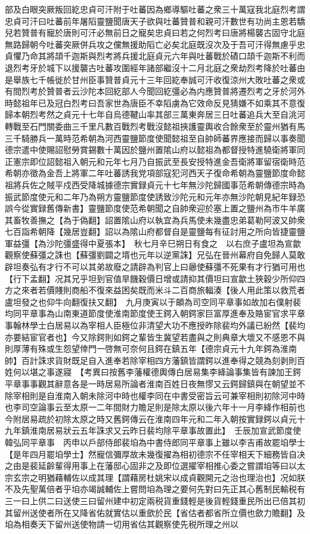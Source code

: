 部及白眼突厥叛回紇忠貞可汗附于吐蕃因為鄉導驅吐蕃之衆三十萬寇我北庭烈考謂忠貞可汗曰吐蕃前年屠䧟靈鹽聞唐天子欲與吐蕃贊普和親可汗數世有功尚主恩若驕兒若贊普有寵於唐則可汗必無前日之寵矣忠貞曰若之何烈考曰唐將楊襲古固守北庭無路歸朝今吐蕃突厥併兵攻之儻無援助䧟亡必矣北庭既沒次及于吾可汗得無慮乎忠貞懼乃命其將頡千迦斯與烈考將兵援北庭貞元六年與吐蕃戰於磧口頡千迦斯不利而退烈考牙於城下以援襲古吐蕃攻圍經年諸部繼沒十二月北庭之衆劫烈考降於吐蕃由是舉族七千帳徙於甘州臣事贊普貞元十三年回紇奉誠可汗收復涼州大敗吐蕃之衆或有間烈考於贊普者云沙陀本回紇部人今聞回紇彊必為内應贊普將遷烈考之牙於河外時懿祖年已及冠白烈考曰吾家世為唐臣不幸䧟虜為它效命反見猜嫌不如乘其不意復歸本朝烈考然之貞元十七年自烏德鞬山率其部三萬東奔居三日吐蕃追兵大至自洮河轉戰至石門關委曲三千里凡數百戰烈考戰沒懿祖挾護靈輿收合餘衆至於靈州猶有馬三千騎勝兵一萬時范希朝為河西靈鹽節度使聞懿祖至自帥師蕃界應接而歸以事奏聞德宗遣中使賜詔慰勞賞錫數十萬因於鹽州置隂山府以懿祖為都督授特進驍衛將軍同正憲宗即位詔懿祖入朝元和元年七月乃自振武至長安授特進金吾衛將軍留宿衛時范希朝亦徵為金吾上將軍二年吐蕃誘我党項部寇犯河西天子復命希朝為靈鹽節度命懿祖將兵佐之賊平戍西受降城據德宗實録貞元十七年無沙陀歸國事范希朝傳德宗時為振武節度使元和二年乃為朔方靈鹽節度使誘致沙陀元和元年亦無沙陀朝見紀年録恐誤今從實録舊傳新書】靈鹽節度使范希朝聞之自帥衆迎於塞上置之鹽州為市牛羊廣其畜牧善撫之【為于偽翻】詔置隂山府以執宜為兵馬使未幾盡忠弟葛勒阿波又帥衆七百詣希朝降【幾居豈翻】詔以為隂山府都督自是靈鹽每有征討用之所向皆捷靈鹽軍益彊【為沙陀彊盛得中夏張本】　秋七月辛巳朔日有食之　以右庶子盧坦為宣歙觀察使蘇彊之誅也【蘇彊劉闢之壻也元年以逆黨誅】兄弘在晉州幕府自免歸人莫敢辟坦奏弘有才行不可以其弟故廢之請辟為判官上曰曏使蘇彊不死果有才行猶可用也【行下孟翻】况其兄乎坦到官值旱饑穀價日增或請抑其價坦曰宣歙土狹穀少所仰四方之來者若價賤則商船不復來益困矣既而米斗二百商旅輻湊【後人用此策以救荒者盧坦發之也仰牛向翻復扶又翻】　九月庚寅以于頔為司空同平章事如故加右僕射裴均同平章事為山南東道節度使淮南節度使王鍔入朝鍔家巨富厚進奉及賂宦官求平章事翰林學士白居易以為宰相人臣極位非清望大功不應授昨除裴均外議已紛然【裴均亦要結宦官者也】今又除鍔則如鍔之輩皆生冀望若盡與之則典章大壞又不感恩不與則厚薄有殊或生怨望倖門一啓無可奈何且鍔在鎮五年【德宗貞元十九年鍔為淮南帥】百計誅求貨財既足自入進奉若除宰相四方藩鎮皆謂鍔以進奉得之競為刻剥則百姓何以堪之事遂寢　【考異曰按舊李藩權德輿傳白居易集李絳論事集皆有諫加王鍔平章事事觀其辭意各是一時居易所論者淮南百姓日夜無憀又云鍔歸鎮與在朝望並不除宰相則是自淮南入朝未除河中時也權李同在中書受密旨云可兼宰相則初除河中時也李司空論事云至太原一二年間財力贍足則是除太原以後六年十一月李絳作相前也今附居易疏於初除太原之時又舊鍔傳云在淮南四年元和二年入朝按實録鍔以貞元十九年鎮淮南居易狀云五年誅求又云昨日裴均除平章事故置此】　壬辰加宣武節度使韓弘同平章事　丙申以戶部侍郎裴垍為中書侍郎同平章事上雖以李吉甫故罷垍學士【是年四月罷垍學士】然寵信彌厚故未幾復擢為相初德宗不任宰相天下細務皆自决之由是裴延齡輩得用事上在藩邸心固非之及即位選擢宰相推心委之嘗謂垍等曰以太宗玄宗之明猶藉輔佐以成其理【謂藉房杜姚宋以成貞觀開元之治也理治也】况如朕不及先聖萬倍者乎垍亦竭誠輔佐上嘗問垍為理之要何先對曰先正其心舊制民輸税有三一曰上供二曰送使三曰留州建中初定兩税貨重錢輕是後貨輕錢重民所出已倍其初其留州送使者所在又降省佑就實估以重歛於民【省估者都省所立價也歛力贍翻】及垍為相奏天下留州送使物請一切用省估其觀察使先税所理之州以